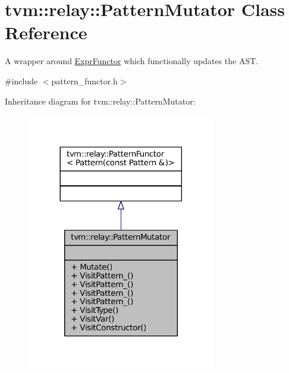 \hypertarget{classtvm_1_1relay_1_1PatternMutator}{}\section{tvm\+:\+:relay\+:\+:Pattern\+Mutator Class Reference}
\label{classtvm_1_1relay_1_1PatternMutator}


A wrapper around \hyperlink{classtvm_1_1relay_1_1ExprFunctor}{Expr\+Functor} which functionally updates the A\+ST.  




{\ttfamily \#include $<$pattern\+\_\+functor.\+h$>$}



Inheritance diagram for tvm\+:\+:relay\+:\+:Pattern\+Mutator\+:
\nopagebreak
\begin{figure}[H]
\begin{center}
\leavevmode
\includegraphics[width=233pt]{classtvm_1_1relay_1_1PatternMutator__inherit__graph}
\end{center}
\end{figure}


